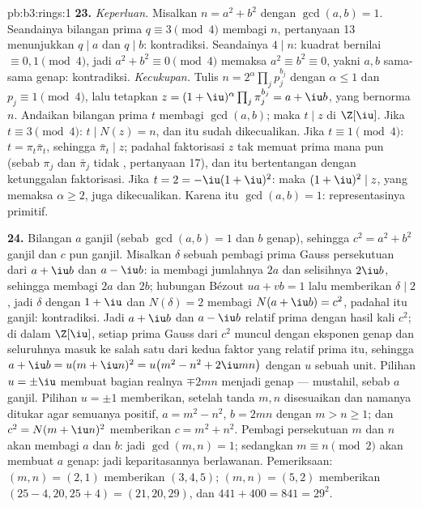 \begin{solution}{pb:b3:rings:1}
\textbf{23.} \emph{Keperluan.} Misalkan $n = a^2 + b^2$ dengan
$\gcd(a, b) = 1$. Seandainya bilangan prima $q \equiv 3 \pmod 4$ membagi $n$,
pertanyaan 13 menunjukkan $q \mid a$ dan $q \mid b$: kontradiksi. Seandainya
$4 \mid n$: kuadrat bernilai $\equiv 0, 1 \pmod 4$, jadi $a^2 + b^2
\equiv 0 \pmod 4$ memaksa $a^2 \equiv b^2 \equiv 0$, yakni $a, b$
sama-sama genap: kontradiksi. \emph{Kecukupan.} Tulis $n =
2^{\alpha}\prod_jp_j^{b_j}$ dengan $\alpha \leq 1$ dan $p_j
\equiv 1 \pmod 4$, lalu tetapkan $z = (1+\iu)^{\alpha}\prod_j
\pi_j^{b_j} = a + \iu b$, yang bernorma $n$. Andaikan bilangan prima $t$
membagi $\gcd(a, b)$; maka $t \mid z$ di $\Z[\iu]$. Jika $t
\equiv 3 \pmod 4$: $t \mid N(z) = n$, dan itu sudah dikecualikan. Jika $t \equiv 1
\pmod 4$: $t = \pi_t\bar\pi_t$, sehingga $\bar\pi_t \mid z$; padahal
faktorisasi $z$ tak memuat prima  mana pun (sebab $\pi_j$ dan
$\bar\pi_j$ tidak , pertanyaan 17), dan itu bertentangan dengan
ketunggalan faktorisasi. Jika $t = 2 = -\iu(1+\iu)^2$: maka
$(1+\iu)^2 \mid z$, yang memaksa $\alpha \geq 2$, juga dikecualikan. Karena itu
$\gcd(a, b) = 1$: representasinya primitif.

\textbf{24.} Bilangan $a$ ganjil (sebab $\gcd(a, b) = 1$ dan $b$ genap), sehingga $c^2
= a^2 + b^2$ ganjil dan $c$ pun ganjil. Misalkan $\delta$ sebuah pembagi
prima Gauss persekutuan dari $a + \iu b$ dan $a - \iu b$: ia
membagi jumlahnya $2a$ dan selisihnya $2\iu b$, sehingga membagi
$2a$ dan $2b$; hubungan Bézout $ua + vb = 1$ lalu memberikan
$\delta \mid 2$, jadi $\delta$  dengan $1 + \iu$ dan
$N(\delta) = 2$ membagi $N(a + \iu b) = c^2$, padahal itu ganjil:
kontradiksi. Jadi $a + \iu b$ dan $a - \iu b$ relatif prima dengan
hasil kali $c^2$; di dalam  $\Z[\iu]$, setiap prima Gauss dari
$c^2$ muncul dengan eksponen genap dan seluruhnya masuk ke salah satu
dari kedua faktor yang relatif prima itu, sehingga $a + \iu b = u(m + \iu
n)^2 = u\bigl(m^2 - n^2 + 2\iu mn\bigr)$ dengan $u$ sebuah unit. Pilihan
$u = \pm\iu$ membuat bagian realnya $\mp 2mn$ menjadi genap ---
mustahil, sebab $a$ ganjil. Pilihan $u = \pm1$ memberikan, setelah
tanda $m, n$ disesuaikan dan namanya ditukar agar
semuanya positif, $a = m^2 - n^2$, $b = 2mn$ dengan $m > n
\geq 1$; dan $c^2 = N(m + \iu n)^2$ memberikan $c = m^2 + n^2$. Pembagi
persekutuan $m$ dan $n$ akan membagi $a$ dan $b$: jadi $\gcd
(m, n) = 1$; sedangkan $m \equiv n \pmod 2$ akan membuat $a$ genap: jadi
keparitasannya berlawanan. Pemeriksaan: $(m, n) = (2, 1)$ memberikan $(3, 4,
5)$; $(m, n) = (5, 2)$ memberikan $(25 - 4, 20, 25 + 4) = (21, 20,
29)$, dan $441 + 400 = 841 = 29^2$.


\end{solution}
